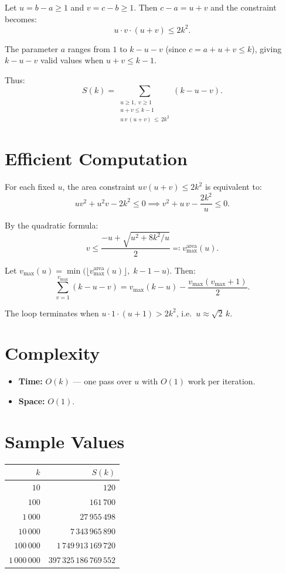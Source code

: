 \documentclass[11pt,a4paper]{article}
\begin{document}
Let $u = b - a \ge 1$ and $v = c - b \ge 1$.  Then $c - a = u + v$ and the constraint becomes:
\[
u \cdot v \cdot (u + v) \le 2k^2.
\]

The parameter $a$ ranges from $1$ to $k - u - v$ (since $c = a+u+v \le k$), giving $k-u-v$ valid values when $u + v \le k-1$.

Thus:
\[
S(k) = \sum_{\substack{u \ge 1,\; v \ge 1 \\ u + v \le k-1 \\ u\,v\,(u+v)\,\le\, 2k^2}}
(k - u - v).
\]

\section{Efficient Computation}

For each fixed $u$, the area constraint $u v(u+v) \le 2k^2$ is equivalent to:
\[
u v^2 + u^2 v - 2k^2 \le 0 \implies v^2 + u\,v - \frac{2k^2}{u} \le 0.
\]

By the quadratic formula:
\[
v \le \frac{-u + \sqrt{u^2 + 8k^2/u}}{2} \eqqcolon v_{\max}^{\text{area}}(u).
\]

Let $v_{\max}(u) = \min\!\bigl(\lfloor v_{\max}^{\text{area}}(u)\rfloor,\; k-1-u\bigr)$.  Then:
\[
\sum_{v=1}^{v_{\max}} (k - u - v)
= v_{\max}(k - u) - \frac{v_{\max}(v_{\max}+1)}{2}.
\]

The loop terminates when $u \cdot 1 \cdot (u+1) > 2k^2$, i.e.\ $u \approx \sqrt{2}\,k$.

\section{Complexity}

\begin{itemize}[nosep]
\item \textbf{Time:} $O(k)$ --- one pass over $u$ with $O(1)$ work per iteration.
\item \textbf{Space:} $O(1)$.
\end{itemize}

\section{Sample Values}

\begin{center}
\begin{tabular}{@{}rr@{}}
\toprule
$k$ & $S(k)$ \\
\midrule
$10$        & $120$ \\
$100$       & $161\,700$ \\
$1\,000$    & $27\,955\,498$ \\
$10\,000$   & $7\,343\,965\,890$ \\
$100\,000$  & $1\,749\,913\,169\,720$ \\
$1\,000\,000$ & $397\,325\,186\,769\,552$ \\
\bottomrule
\end{tabular}
\end{center}
\end{document}
